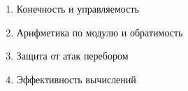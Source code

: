 \begin{frame}
\begin{enumerate}[label={\alph*)}]
    \item Конечность и управляемость
    \item Арифметика по модулю и обратимость
    \item Защита от атак перебором
    \item Эффективность вычислений
\end{enumerate}
\end{frame}